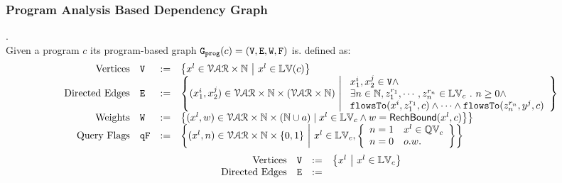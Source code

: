 \subsubsection{Program Analysis Based Dependency Graph}
\begin{defn}
    .
    \label{def:prog_graph}
    \\
Given a program ${c}$
its program-based graph 
$\mathtt{{G_{prog}}}({c}) = (\mathtt{V}, \mathtt{E}, \mathtt{W}, \mathtt{F})$ is. defined as:
\\
\[
\begin{array}{rlcl}
\text{Vertices} &
\vertxs & := & \left\{ 
x^l \in \mathcal{VAR} \times \mathbb{N}
~ \middle\vert ~
x^l \in \lvar({{c}})
\right\}
\\
\text{Directed Edges} &
\edges & := & 
\left\{ 
  ({x}_1^{i}, {x}_2^{j}) \in \mathcal{VAR} \times \mathbb{N} \times (\mathcal{VAR} \times \mathbb{N})
  ~ \middle\vert ~
  \begin{array}{l}
    {x}_1^{i}, {x}_2^{j} \in \vertxs
	\land
    \\
    \exists n \in \mathbb{N}, z_1^{r_1}, \cdots, z_n^{r_n} \in \lvar_{{c}} \st 
    n \geq 0 \land
    \\
    \flowsto(x^i,  z_1^{r_1}, c) 
    \land \cdots \land \flowsto(z_n^{r_n}, y^j, c) 
  \end{array}
\right\}
\\
\text{Weights} &
\weights & := &
	\big\{ (x^l, w) \in \mathcal{VAR} \times \mathbb{N} \times (\mathbb{N} \cup \aexpr)
	\mid
	x^l \in \lvar_{{c}} \land w = \rb(x^l, c)
	\big\} 
	\big\}
\\
\text{Query Flags} &
\qflag & := & 
\left\{(x^l, n)  \in \mathcal{VAR} \times \mathbb{N}  \times \{0, 1\} 
~ \middle\vert ~
 x^l \in \lvar_{c},
 \left\{
\begin{array}{ll}
n = 1 & x^l \in \qvar_{c} \\ 
n = 0 & o.w.
\end{array}
\right\}
\right\}
\end{array}
\]
%
\[
\begin{array}{rlcl}
\text{Vertices} &
\vertxs & := & \left\{ 
x^l 
~ \middle\vert ~
x^l \in \lvar_{{c}}
\right\}
\\
\text{Directed Edges} &
\edges & := & 

\end{array}\]
\end{defn}
